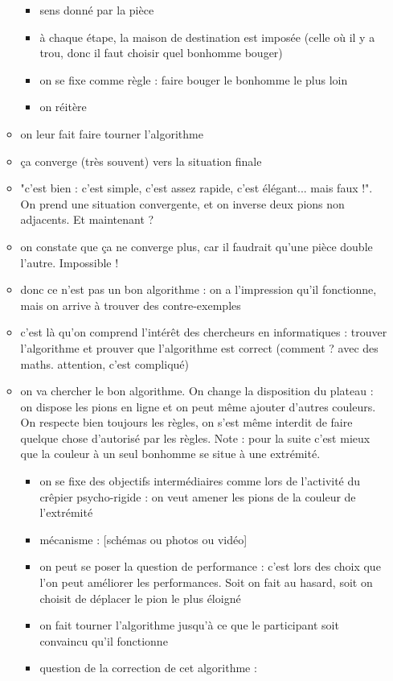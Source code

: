 \documentclass[a4paper]{article}
\begin{document}
\begin{itemize}
\begin{itemize}
\begin{itemize}
\item sens donné par la pièce
\item à chaque étape, la maison de destination est imposée (celle où il y a trou, donc il faut choisir quel bonhomme bouger)
\item on se fixe comme règle : faire bouger le bonhomme le plus loin
\item on réitère
\end{itemize}
\item on leur fait faire tourner l'algorithme
\item ça converge (très souvent) vers la situation finale
\item "c'est bien : c'est simple, c'est assez rapide, c'est élégant... mais faux !". On prend une situation convergente, et on inverse deux pions non adjacents. Et maintenant ?
\item on constate que ça ne converge plus, car il faudrait qu'une pièce double l'autre. Impossible !
\item donc ce n'est pas un bon algorithme : on a l'impression qu'il fonctionne, mais on arrive à trouver des contre-exemples
\item c'est là qu'on comprend l'intérêt des chercheurs en informatiques : trouver l'algorithme et prouver que l'algorithme est correct (comment ? avec des maths. attention, c'est compliqué)
\item on va chercher le bon algorithme. On change la disposition du plateau : on dispose les pions en ligne et on peut même ajouter d'autres couleurs. On respecte bien toujours les règles, on s'est même interdit de faire quelque chose d'autorisé par les règles. Note : pour la suite c'est mieux que la couleur à un seul bonhomme se situe à une extrémité.
\begin{itemize}
\item on se fixe des objectifs intermédiaires comme lors de l'activité du crêpier psycho-rigide : on veut amener les pions de la couleur de l'extrémité
\item mécanisme : [schémas ou photos ou vidéo]
\item on peut se poser la question de performance : c'est lors des choix que l'on peut améliorer les performances. Soit on fait au hasard, soit on choisit de déplacer le pion le plus éloigné
\item on fait tourner l'algorithme jusqu'à ce que le participant soit convaincu qu'il fonctionne
\item question de la correction de cet algorithme :

\end{itemize}
\end{itemize}
\end{itemize}
\end{document}
